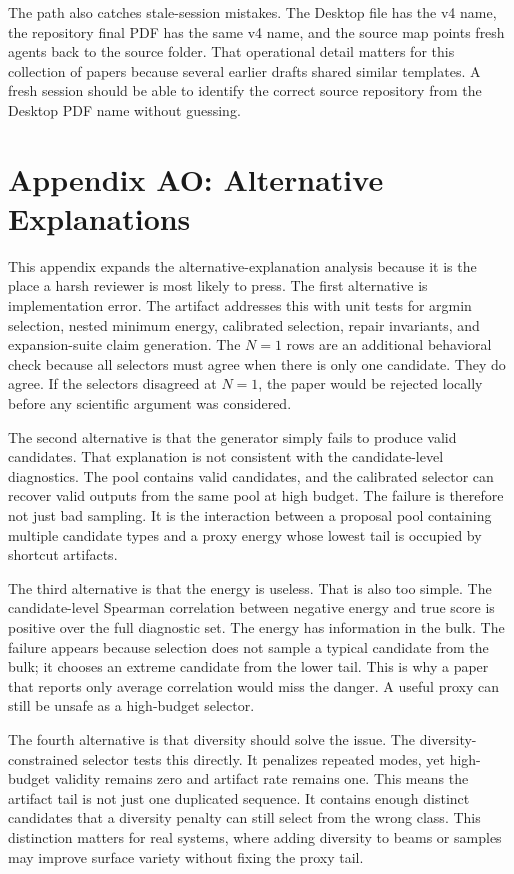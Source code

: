 \documentclass{article}
\begin{document}
The path also catches stale-session mistakes. The Desktop file has the v4
name, the repository final PDF has the same v4 name, and the source map points
fresh agents back to the source folder. That operational detail matters for
this collection of papers because several earlier drafts shared similar
templates. A fresh session should be able to identify the correct source
repository from the Desktop PDF name without guessing.

\section*{Appendix AO: Alternative Explanations}

This appendix expands the alternative-explanation analysis because it is the
place a harsh reviewer is most likely to press. The first alternative is
implementation error. The artifact addresses this with unit tests for argmin
selection, nested minimum energy, calibrated selection, repair invariants, and
expansion-suite claim generation. The $N=1$ rows are an additional behavioral
check because all selectors must agree when there is only one candidate. They
do agree. If the selectors disagreed at $N=1$, the paper would be rejected
locally before any scientific argument was considered.

The second alternative is that the generator simply fails to produce valid
candidates. That explanation is not consistent with the candidate-level
diagnostics. The pool contains valid candidates, and the calibrated selector
can recover valid outputs from the same pool at high budget. The failure is
therefore not just bad sampling. It is the interaction between a proposal pool
containing multiple candidate types and a proxy energy whose lowest tail is
occupied by shortcut artifacts.

The third alternative is that the energy is useless. That is also too simple.
The candidate-level Spearman correlation between negative energy and true
score is positive over the full diagnostic set. The energy has information in
the bulk. The failure appears because selection does not sample a typical
candidate from the bulk; it chooses an extreme candidate from the lower tail.
This is why a paper that reports only average correlation would miss the
danger. A useful proxy can still be unsafe as a high-budget selector.

The fourth alternative is that diversity should solve the issue. The
diversity-constrained selector tests this directly. It penalizes repeated
modes, yet high-budget validity remains zero and artifact rate remains one.
This means the artifact tail is not just one duplicated sequence. It contains
enough distinct candidates that a diversity penalty can still select from the
wrong class. This distinction matters for real systems, where adding diversity
to beams or samples may improve surface variety without fixing the proxy
tail.
\end{document}
